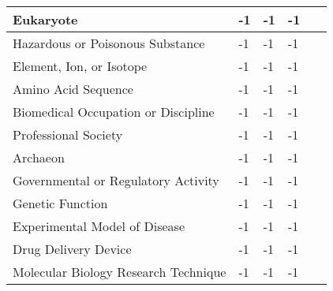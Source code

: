 \documentclass[10.7pt,]{article}
\begin{document}
\begin{longtable}{|l|p{0.3cm}|p{0.3cm}|p{0.3cm}|p{7.9cm}|}
        Eukaryote & -1 & -1 & -1 & ~ \\ \hline
        Hazardous or Poisonous Substance & -1 & -1 & -1 & ~ \\ \hline
        Element, Ion, or Isotope & -1 & -1 & -1 & ~ \\ \hline
        Amino Acid Sequence & -1 & -1 & -1 & ~ \\ \hline
        Biomedical Occupation or Discipline & -1 & -1 & -1 & ~ \\ \hline
        Professional Society & -1 & -1 & -1 & ~ \\ \hline
        Archaeon & -1 & -1 & -1 & ~ \\ \hline
        Governmental or Regulatory Activity & -1 & -1 & -1 & ~ \\ \hline
        Genetic Function & -1 & -1 & -1 & ~ \\ \hline
        Experimental Model of Disease & -1 & -1 & -1 & ~ \\ \hline
        Drug Delivery Device & -1 & -1 & -1 & ~ \\ \hline
        Molecular Biology Research Technique & -1 & -1 & -1 & ~ \\ \hline
\end{longtable}
\end{document}
